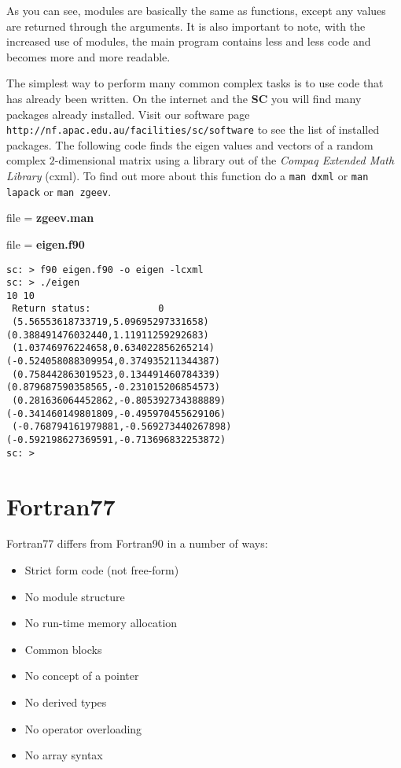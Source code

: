 \documentclass[12pt,a4paper,oneside,openany]{report}
\newcommand{\fcode}[1]{\par file = \textbf{#1} }
\newcommand{\code}[1]{\texttt{#1}}
\newcommand{\SC}{\textbf{SC} }
\begin{document}
As you can see, modules are basically the same as functions, except any values are returned through the arguments.  It is also important to note, with the increased use of modules, the main program contains less and less code and becomes more and more readable.

\newpage

The simplest way to perform many common complex tasks is to use code that has already been written.  On the internet and the \SC you will find many packages already installed.  Visit our software page \code{http://nf.apac.edu.au/facilities/sc/software} to see the list of installed packages.  The following code finds the eigen values and vectors of a random complex $2$-dimensional matrix using a library out of the \textit{Compaq Extended Math Library} (cxml).  To find out more about this function do a \code{man dxml} or \code{man lapack} or \code{man zgeev}.
\fcode{zgeev.man}

\newpage

\fcode{eigen.f90}

\begin{verbatim}
sc: > f90 eigen.f90 -o eigen -lcxml
sc: > ./eigen
10 10
 Return status:            0
 (5.56553618733719,5.09695297331658) (0.388491476032440,1.11911259292683)
 (1.03746976224658,0.634022856265214) (-0.524058088309954,0.374935211344387)
 (0.758442863019523,0.134491460784339) (0.879687590358565,-0.231015206854573)
 (0.281636064452862,-0.805392734388889) (-0.341460149801809,-0.495970455629106)
 (-0.768794161979881,-0.569273440267898) (-0.592198627369591,-0.713696832253872)
sc: >
\end{verbatim}

\newpage

\section*{Fortran77}

Fortran77 differs from Fortran90 in a number of ways:
\begin{itemize}
\item Strict form code (not free-form)
\item No module structure
\item No run-time memory allocation
\item Common blocks
\item No concept of a pointer
\item No derived types
\item No operator overloading
\item No array syntax
\end{itemize}
\end{document}
